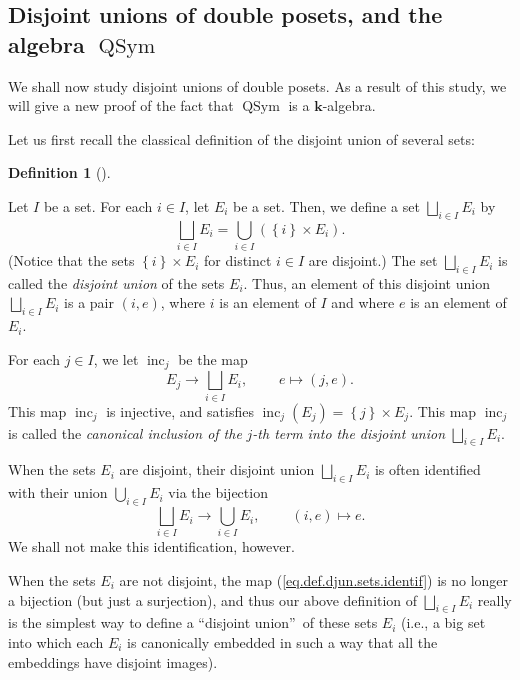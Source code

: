 \documentclass[numbers=enddot,12pt,final,onecolumn,notitlepage,abstracton]{scrartcl}
\theoremstyle{definition}
\newtheorem{defi}[theo]{Definition}
\newenvironment{definition}[1][]
{\begin{defi}[#1]\begin{leftbar}}
{\end{leftbar}\end{defi}}
\let\cupnonlimits\bigcup
\renewcommand{\bigcup}{\cupnonlimits\limits}
\newenvironment{verlong}{}{}
\begin{document}
\begin{verlong}
\begin{footnotesize}
\subsection{Disjoint unions of double posets, and the algebra
$\operatorname*{QSym}$}

We shall now study disjoint unions of double posets. As a result of this
study, we will give a new proof of the fact that $\operatorname*{QSym}$ is a
$\mathbf{k}$-algebra.

Let us first recall the classical definition of the disjoint union of several sets:

\begin{definition}
\label{def.djun.sets}Let $I$ be a set. For each $i\in I$, let $E_{i}$ be a
set. Then, we define a set $\bigsqcup_{i\in I}E_{i}$ by%
\[
\bigsqcup_{i\in I}E_{i}=\bigcup_{i\in I}\left(  \left\{  i\right\}  \times
E_{i}\right)  .
\]
(Notice that the sets $\left\{  i\right\}  \times E_{i}$ for distinct $i\in I$
are disjoint.) The set $\bigsqcup_{i\in I}E_{i}$ is called the
\textit{disjoint union} of the sets $E_{i}$. Thus, an element of this disjoint
union $\bigsqcup_{i\in I}E_{i}$ is a pair $\left(  i,e\right)  $, where $i$ is
an element of $I$ and where $e$ is an element of $E_{i}$.

For each $j\in I$, we let $\operatorname*{inc}\nolimits_{j}$ be the map%
\[
E_{j}\rightarrow\bigsqcup_{i\in I}E_{i},\ \ \ \ \ \ \ \ \ \ e\mapsto\left(
j,e\right)  .
\]
This map $\operatorname*{inc}\nolimits_{j}$ is injective, and satisfies
$\operatorname*{inc}\nolimits_{j}\left(  E_{j}\right)  =\left\{  j\right\}
\times E_{j}$. This map $\operatorname*{inc}\nolimits_{j}$ is called the
\textit{canonical inclusion of the }$j$\textit{-th term into the disjoint
union }$\bigsqcup_{i\in I}E_{i}$.

When the sets $E_{i}$ are disjoint, their disjoint union $\bigsqcup_{i\in
I}E_{i}$ is often identified with their union $\bigcup_{i\in I}E_{i}$ via the
bijection%
\begin{equation}
\bigsqcup_{i\in I}E_{i}\rightarrow\bigcup_{i\in I}E_{i}%
,\ \ \ \ \ \ \ \ \ \ \left(  i,e\right)  \mapsto e.
\label{eq.def.djun.sets.identif}%
\end{equation}
We shall not make this identification, however.

When the sets $E_{i}$ are not disjoint, the map
(\ref{eq.def.djun.sets.identif}) is no longer a bijection (but just a
surjection), and thus our above definition of $\bigsqcup_{i\in I}E_{i}$ really
is the simplest way to define a \textquotedblleft disjoint
union\textquotedblright\ of these sets $E_{i}$ (i.e., a big set into which
each $E_{i}$ is canonically embedded in such a way that all the embeddings
have disjoint images).
\end{definition}


\end{footnotesize}
\end{verlong}
\end{document}
